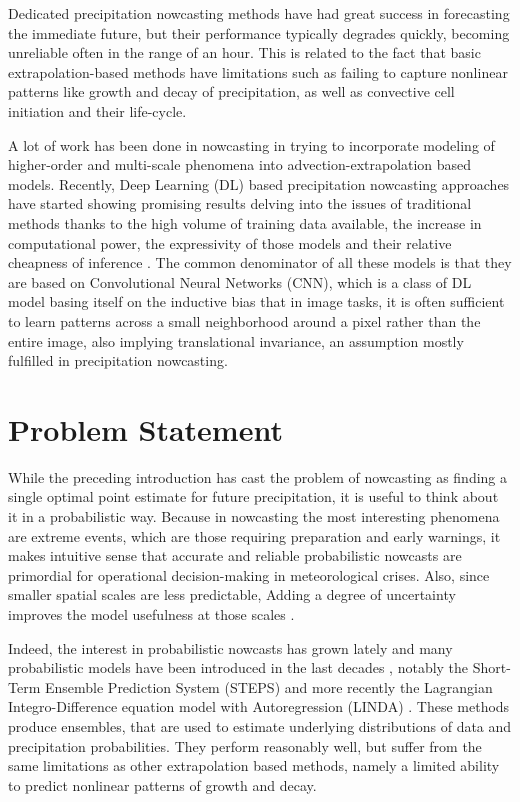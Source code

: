 Dedicated precipitation nowcasting methods have had great success in forecasting the immediate future, but their performance typically degrades quickly, becoming unreliable often in the range of an hour. This is related to the fact that basic extrapolation-based methods have limitations such as failing to capture nonlinear patterns like growth and decay of precipitation, as well as convective cell initiation and their life-cycle. 

A lot of work has been done in nowcasting in trying to incorporate modeling of higher-order and multi-scale phenomena into advection-extrapolation based models. Recently, Deep Learning (DL) based precipitation nowcasting approaches have started showing promising results delving into the issues of traditional methods thanks to the high volume of training data available, the increase in computational power, the expressivity of those models and their relative cheapness of inference \cite{shi_convolutional_2015,shi_deep_2017,ayzel_rainnet_nodate}. The common denominator of all these models is that they are based on Convolutional Neural Networks (CNN), which is a class of DL model basing itself on the inductive bias that in image tasks, it is often sufficient to learn patterns across a small neighborhood around a pixel rather than the entire image, also implying translational invariance, an assumption mostly fulfilled in precipitation nowcasting.


\section{Problem Statement}


While the preceding introduction has cast the problem of nowcasting as finding a single optimal point estimate for future precipitation, it is useful to think about it in a probabilistic way. Because in nowcasting the most interesting phenomena are extreme events, which are those requiring preparation and early warnings, it makes intuitive sense that accurate and reliable probabilistic nowcasts are primordial for operational decision-making in meteorological crises. Also, since smaller spatial scales are less predictable, Adding a degree of uncertainty improves the model usefulness at those scales \cite{germann2002scale}.

Indeed, the interest in probabilistic nowcasts has grown lately and many probabilistic models have been introduced in the last decades \cite{seed_formulation_2013, andersson_model_1991, schmid2002short, fox2005bayesian}, notably the Short-Term Ensemble Prediction System (STEPS) \cite{bowler_steps_2006} and more recently the Lagrangian Integro-Difference equation model with Autoregression (LINDA) \cite{pulkkinen_lagrangian_2021}. These methods produce ensembles, that are used to estimate underlying distributions of data and precipitation probabilities. They perform reasonably well, but  suffer from the same limitations as other extrapolation based methods, namely a limited ability to predict nonlinear patterns of growth and decay. 

